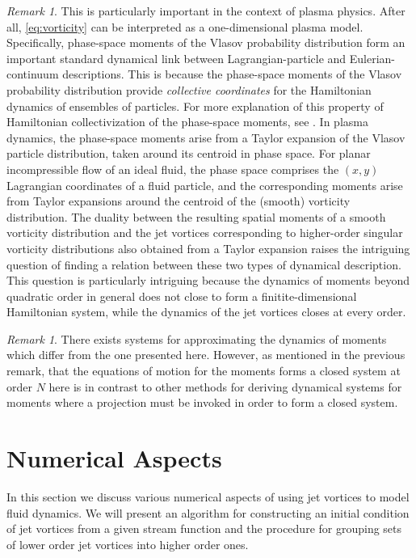 \documentclass[12pt]{amsart}
\theoremstyle{remark}
\newtheorem{rmk}[thm]{Remark}
\begin{document}
	\begin{rmk}
	This is particularly important in the context of plasma physics.
	After all, \eqref{eq:vorticity} can be interpreted as a one-dimensional plasma model.
	Specifically, phase-space moments of the Vlasov probability distribution form an important standard dynamical link between Lagrangian-particle and Eulerian-continuum descriptions.
	This is because the phase-space moments of the Vlasov probability distribution provide \emph{collective coordinates} for the Hamiltonian dynamics of ensembles of particles.
	For more explanation of this property of Hamiltonian collectivization of the phase-space moments, see \cite{GuilleminSternberg1990,HolmLysenkoScovel1990,GibbonsHolmTronci2008a,GibbonsHolmTronci2008b}.
	In plasma dynamics, the phase-space moments arise from a Taylor expansion of the Vlasov particle distribution, taken around its centroid in phase space. For planar incompressible flow of an ideal fluid, the phase space comprises the $(x,y)$ Lagrangian coordinates of a fluid particle, and the corresponding moments arise from Taylor expansions around the centroid of the (smooth) vorticity distribution. The duality between the resulting spatial moments of a smooth vorticity distribution and the jet vortices corresponding to higher-order singular vorticity distributions also obtained from a Taylor expansion raises the intriguing question of finding a relation between these two types of dynamical description. This question is particularly intriguing because the dynamics of moments beyond quadratic order in general does not close to form a finitite-dimensional Hamiltonian system, while the dynamics of the jet vortices closes at every order. 
	\end{rmk}
	
	\begin{rmk}
	There exists systems for approximating the dynamics of moments which differ from the one presented here.
	However, as mentioned in the previous remark, that the equations of motion for the moments forms a closed system at order $N$ here
	is in contrast to other methods for deriving dynamical systems for moments
	\cite{UminskyWayneBarbaro2010, NagemSandriUminskyWayne2009,GibbonsHolmTronci2008a,GibbonsHolmTronci2008b}
	where a projection must be invoked in order to form a closed system.
	\end{rmk}

\section{Numerical Aspects}
\label{sec:numerics}
In this section we discuss various numerical aspects of using jet vortices to model fluid dynamics.
We will present an algorithm for constructing an initial condition of jet vortices from a given stream
function and the procedure for grouping sets of lower order jet vortices into higher order ones.
\end{document}
